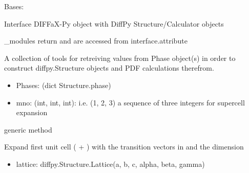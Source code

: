 \documentclass[letterpaper,10pt,english]{sphinxmanual}
\begin{document}
\begin{fulllineitems}
\label{\detokenize{rst/interface:mstack.interface.Interface}}
Bases: 

Interface DIFFaX-Py object with DiffPy Structure/Calculator objects

\_modules return  and are accessed
from interface.attribute

\begin{fulllineitems}
\label{\detokenize{rst/interface:mstack.interface.Interface.__init__}}
A collection of tools for retreiving values from Phase object(s) in order
to construct diffpy.Structure objects and PDF calculations therefrom.
\begin{itemize}
\item {} 
Phases: (dict \textbar{} Structure.phase)

\item {} 
mno: (int, int, int): i.e. (1, 2, 3) a sequence of three integers for supercell expansion

\end{itemize}

\end{fulllineitems}


\begin{fulllineitems}
\label{\detokenize{rst/interface:mstack.interface.Interface.add}}
generic method

\end{fulllineitems}


\begin{fulllineitems}
\label{\detokenize{rst/interface:mstack.interface.Interface.expand_supercell}}
Expand first unit cell ( +  ) with the transition
vectors in  and the dimension 
\begin{itemize}
\item {} 
lattice: diffpy.Structure.Lattice(a, b, c, alpha, beta, gamma)


\end{itemize}
\end{fulllineitems}
\end{fulllineitems}
\end{document}
